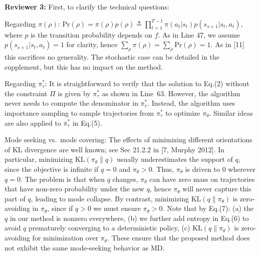 \documentclass{article}
\begin{document}
{\bf Reviewer 3: }
%
First, to clarify the technical questions:

Regarding $\pi(\rho)$:
$\text{Pr}(\rho) = \pi(\rho) p(\rho) \triangleq
\prod_{t=1}^{T-1}{ \pi(a_t | s_t) p(s_{s+1} | s_t, a_t)}$, 
where $p$ is the transition probability depends on $f$. 
As in Line 47, we assume $p(s_{s+1} | s_t, a_t) = 1$ for clarity, 
hence $\sum_{\rho}{\pi(\rho)} = \sum_{\rho}{\text{Pr}(\rho)} = 1$.
As in [11] this sacrifices no generality.
The stochastic case can be detailed in the supplement,
but this has no impact on the method.


Regarding $\pi_{\tau}^{*}$:
It is straightforward to verify that 
the solution to Eq.(2) without the constraint $\Pi$
is given by $\pi_{\tau}^{*}$ as shown in Line~63.
However, the algorithm never needs to compute the denominator in
$\pi_{\tau}^{*}$.
Instead, the algorithm uses importance sampling to sample trajectories from
$\pi_{\tau}^{*}$ to optimize $\pi_\theta$.
Similar ideas are also applied to $\bar{\pi}_\tau^*$ in Eq.(5). 

Mode seeking vs.\ mode covering:
The effects of minimizing different orientations of KL divergence are
well known; see Sec 21.2.2 in [7, Murphy 2012].
In particular, minimizing $\text{KL}(\pi_{\theta}\|q)$
usually underestimates the support of $q$,
since the objective is infinite if $q = 0$ and $\pi_{\theta} > 0$.
Thus, $\pi_\theta$ is driven to $0$ wherever $q=0$.
The problem is that when $q$ changes, $\pi_\theta$ can have zero mass
on trajectories that have non-zero probability under the new $q$,
hence $\pi_\theta$ will never capture this part of $q$,
leading to mode collapse.
By contrast, minimizing $\text{KL}(q\|\pi_{\theta})$ 
is zero-avoiding in $\pi_{\theta}$,
since if $q > 0$ we must ensure $\pi_{\theta} > 0$.
Note that by Eq.(7):
(a) the $q$ in our method is nonzero everywhere,
(b) we further add entropy in Eq.(6) to avoid $q$ prematurely converging
to a deterministic policy, 
(c) $\text{KL}(q\|\pi_{\theta})$ is zero-avoiding for minimization over
$\pi_{\theta}$.
These ensure that the proposed method does not exhibit the same mode-seeking 
behavior as MD.
\end{document}
